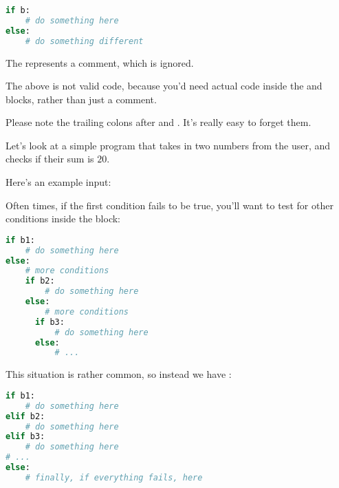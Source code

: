 \begin{lstlisting}[language=Python]
if b:
    # do something here
else:
    # do something different
\end{lstlisting}

The \code{#} represents a comment, which is ignored.

\begin{remark}
  The above is not valid code, because you'd need actual code inside
  the  and  blocks, rather than just a comment.
\end{remark}

\begin{remark}
  Please note the trailing colons after  and
  . It's really easy to forget them.
\end{remark}

Let's look at a simple program that takes in two numbers from the
user, and checks if their sum is $20$.


Here's an example input:


Often times, if the first condition fails to be true, you'll want to
test for other conditions inside the  block:

\begin{lstlisting}[language=Python]
if b1:
    # do something here
else:
    # more conditions
    if b2:
        # do something here
    else:
        # more conditions
      if b3:
          # do something here
      else:
          # ...
\end{lstlisting}

This situation is rather common, so instead we have :

\begin{lstlisting}[language=Python]
if b1:
    # do something here
elif b2:
    # do something here
elif b3:
    # do something here
# ...
else:
    # finally, if everything fails, here
\end{lstlisting}